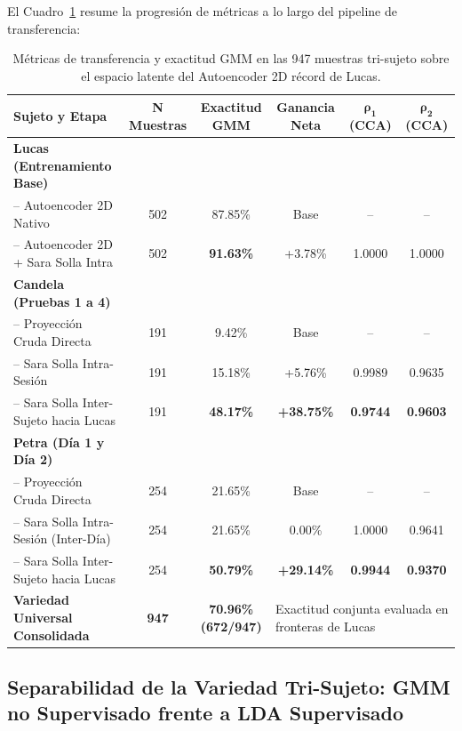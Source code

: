 \documentclass[11pt,a4paper,openany]{book}
\theoremstyle{definition}
\begin{document}
El Cuadro~\ref{tab:transferencia_ae2d_tri_sujeto} resume la progresión de métricas a lo largo del pipeline de transferencia:

\begin{table}[H]
\centering
\small
\begin{tabular}{lccccc}
\toprule
\textbf{Sujeto y Etapa} & \textbf{N Muestras} & \textbf{Exactitud GMM} & \textbf{Ganancia Neta} & $\mathbf{\rho_1}$ \textbf{(CCA)} & $\mathbf{\rho_2}$ \textbf{(CCA)} \\
\midrule
\textbf{Lucas (Entrenamiento Base)} & & & & & \\
-- Autoencoder 2D Nativo & 502 & 87.85\% & Base & -- & -- \\
-- Autoencoder 2D + Sara Solla Intra & 502 & \textbf{91.63\%} & +3.78\% & 1.0000 & 1.0000 \\
\midrule
\textbf{Candela (Pruebas 1 a 4)} & & & & & \\
-- Proyección Cruda Directa & 191 & 9.42\% & Base & -- & -- \\
-- Sara Solla Intra-Sesión & 191 & 15.18\% & +5.76\% & 0.9989 & 0.9635 \\
-- Sara Solla Inter-Sujeto hacia Lucas & 191 & \textbf{48.17\%} & \textbf{+38.75\%} & \textbf{0.9744} & \textbf{0.9603} \\
\midrule
\textbf{Petra (Día 1 y Día 2)} & & & & & \\
-- Proyección Cruda Directa & 254 & 21.65\% & Base & -- & -- \\
-- Sara Solla Intra-Sesión (Inter-Día) & 254 & 21.65\% & 0.00\% & 1.0000 & 0.9641 \\
-- Sara Solla Inter-Sujeto hacia Lucas & 254 & \textbf{50.79\%} & \textbf{+29.14\%} & \textbf{0.9944} & \textbf{0.9370} \\
\midrule
\textbf{Variedad Universal Consolidada} & \textbf{947} & \textbf{70.96\% (672/947)} & \multicolumn{3}{l}{Exactitud conjunta evaluada en fronteras de Lucas} \\
\bottomrule
\end{tabular}
\caption{Métricas de transferencia y exactitud GMM en las 947 muestras tri-sujeto sobre el espacio latente del Autoencoder 2D récord de Lucas.}
\label{tab:transferencia_ae2d_tri_sujeto}
\end{table}

\subsection{Separabilidad de la Variedad Tri-Sujeto: GMM no Supervisado frente a LDA Supervisado}
\label{subsec:gmm_vs_lda_tri_sujeto}
\end{document}
